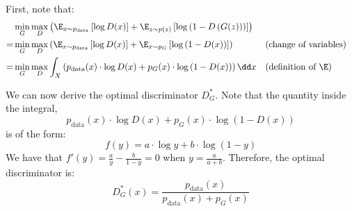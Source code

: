 First, note that:
\begin{align*}
    &\min_G\max_D \left(
        \E_{x\sim p_{\text{data}}}\left[\log D(x)\right] + \E_{z\sim p(z)}\left[\log\left(1-D\left(G(z)\right)\right)\right]
    \right) \\
    = &\min_G\max_D \left(
        \E_{x\sim p_{\text{data}}}\left[\log D(x)\right] + \E_{x\sim p_G}\left[\log\left(1-D(x)\right)\right]
    \right) && \text{(change of variables)} \\
    = &\min_G\max_D
        \int_X \left( p_{\text{data}}(x)\cdot\log D(x) + p_G(x)\cdot\log\left(1-D(x)\right) \right) \dd x
     && \text{(definition of $\E$)}
\end{align*}

We can now derive the optimal discriminator $D_G^*$. Note that the quantity inside the integral,
\begin{equation*}
    p_{\text{data}}(x)\cdot\log D(x) + p_G(x)\cdot\log\left(1-D(x)\right)
\end{equation*}
is of the form:
\begin{equation*}
    f(y) = a\cdot\log y + b\cdot\log(1-y)
\end{equation*}
We have that $f'(y) = \frac{a}{y} - \frac{b}{1-y} = 0$ when $y = \frac{a}{a+b}$. Therefore, the optimal discriminator is:
\begin{equation*}
    D_G^*(x) = \frac{p_{\text{data}}(x)}{p_{\text{data}}(x) + p_G(x)}
\end{equation*}

